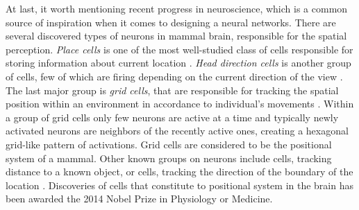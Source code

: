 At last, it worth mentioning recent progress in neuroscience, which is a common source of inspiration when it comes to designing a neural networks. There are several discovered types of neurons in mammal brain, responsible for the spatial perception. \textit{Place cells} is one of the most well-studied class of cells responsible for storing information about current location \cite{Fenton2009, Hartley2014}. \textit{Head direction cells} is another group of cells, few of which are firing depending on the current direction of the view \cite{Taube1990, Taube1990a}. The last major group is \textit{grid cells}, that are responsible for tracking the spatial position within an environment in accordance to individual's movements \cite{Moser2008}. Within a group of grid cells only few neurons are active at a time and typically newly activated neurons are neighbors of the recently active ones, creating a hexagonal grid-like pattern of activations. Grid cells are considered to be the positional system of a mammal. Other known groups on neurons include cells, tracking distance to a known object, or cells, tracking the direction of the boundary of the location \cite{Lever2009}. Discoveries of cells that constitute to positional system in the brain has been awarded the 2014 Nobel Prize in Physiology or Medicine.

